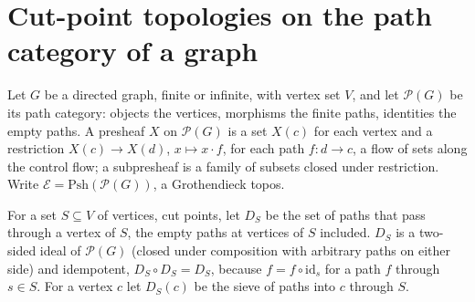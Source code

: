 \documentclass[11pt]{amsart}
\theoremstyle{definition}
\newcommand{\Psh}{\mathrm{Psh}}
\newcommand{\cP}{\mathcal P}
\newcommand{\cE}{\mathcal E}
\begin{document}
\section{Cut-point topologies on the path category of a graph}\label{sec:cut}

Let $G$ be a directed graph, finite or infinite, with vertex set $V$, and
let $\cP(G)$ be its path category: objects the vertices, morphisms the
finite paths, identities the empty paths. A presheaf $X$ on $\cP(G)$ is a
set $X(c)$ for each vertex and a restriction $X(c)\to X(d)$, $x\mapsto
x\cdot f$, for each path $f\colon d\to c$, a flow of sets along the control
flow; a subpresheaf is a family of subsets closed under restriction. Write
$\cE=\Psh(\cP(G))$, a Grothendieck topos.

For a set $S\subseteq V$ of vertices, cut points, let $D_S$ be the set of
paths that pass through a vertex of $S$, the empty paths at vertices of $S$
included. $D_S$ is a two-sided ideal of $\cP(G)$ (closed under composition
with arbitrary paths on either side) and idempotent, $D_S\circ D_S=D_S$,
because $f=f\circ\mathrm{id}_s$ for a path $f$ through $s\in S$. For a
vertex $c$ let $D_S(c)$ be the sieve of paths into $c$ through $S$.
\end{document}
